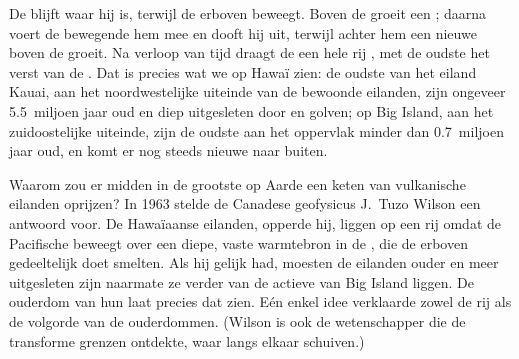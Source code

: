 De  blijft waar hij is, terwijl de  erboven beweegt. Boven de
 groeit een ; daarna voert de bewegende  hem mee en
dooft hij uit, terwijl achter hem een nieuwe  boven de 
groeit. Na verloop van tijd draagt de  een hele rij , met de
oudste het verst van de . Dat is precies wat we op Hawaï zien: de
oudste  van het eiland Kauai, aan het noordwestelijke uiteinde
van de bewoonde eilanden, zijn ongeveer 5.5~miljoen jaar oud en diep
uitgesleten door  en golven; op Big Island, aan het zuidoostelijke
uiteinde, zijn de oudste  aan het oppervlak minder dan
0.7~miljoen jaar oud, en komt er nog steeds nieuwe  naar buiten.

\begin{history}
Waarom zou er midden in de grootste  op Aarde een keten van
vulkanische eilanden oprijzen? In 1963 stelde de Canadese geofysicus
J.~Tuzo Wilson een antwoord voor. De Hawaïaanse eilanden, opperde hij,
liggen op een rij omdat de Pacifische  beweegt over een diepe, vaste
warmtebron in de , die de  erboven gedeeltelijk doet smelten.
Als hij gelijk had, moesten de eilanden ouder en meer uitgesleten zijn
naarmate ze verder van de actieve  van Big Island liggen. De
ouderdom van hun  laat precies dat zien. Eén enkel idee verklaarde
zowel de rij als de volgorde van de ouderdommen. (Wilson is ook de
wetenschapper die de transforme grenzen ontdekte, waar  langs elkaar
schuiven.)
\end{history}

